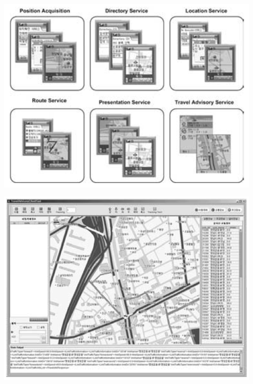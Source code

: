 \documentclass{article}
\begin{document}
\begin{CJK}{UTF8}{gbsn}
	\noindent\begin{minipage}{\textwidth}
		\centering
		\includegraphics[bb=0 0 706 527, scale=0.45]{figure/fig13.png}
	\end{minipage}

	\noindent\begin{minipage}{\textwidth}
		\centering
		\includegraphics[bb=0 0 768 573, scale=0.45]{figure/fig14.png}
	\end{minipage}


\end{CJK}
\end{document}
